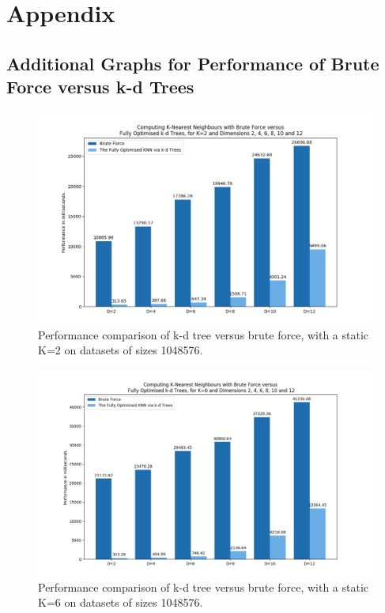 
\section{Appendix}
\label{sec:appendix}

\subsection{Additional Graphs for Performance of Brute Force versus k-d Trees}

\begin{figure}[H]
\centering
\includegraphics[width=1\textwidth]{pics/plot-figs/new-brute-k2.png}
\caption{Performance comparison of k-d tree versus brute force, with a static K=2 on datasets of sizes 1048576.}
\label{fig:b1}
\end{figure}


\begin{figure}[H]
\centering
\includegraphics[width=1\textwidth]{pics/plot-figs/new-brute-k6.png}
\caption{Performance comparison of k-d tree versus brute force, with a static K=6 on datasets of sizes 1048576.}
\label{fig:b2}
\end{figure}


